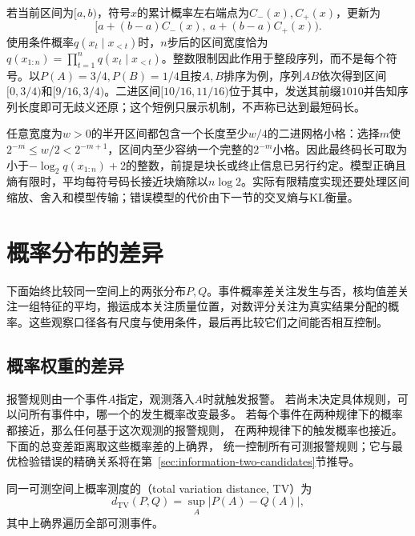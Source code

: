 若当前区间为\([a,b)\)，符号\(x\)的累计概率左右端点为\(C_-(x),C_+(x)\)，更新为
\[
 [a+(b-a)C_-(x),\ a+(b-a)C_+(x)).
\]
使用条件概率\(q(x_t\mid x_{<t})\)时，\(n\)步后的区间宽度恰为
\(q(x_{1:n})=\prod_{t=1}^nq(x_t\mid x_{<t})\)。整数限制因此作用于整段序列，而不是每个符号。以\(P(A)=3/4,P(B)=1/4\)且按\(A,B\)排序为例，序列\(AB\)依次得到区间\([0,3/4)\)和\([9/16,3/4)\)。二进区间\([10/16,11/16)\)位于其中，发送其前缀\(1010\)并告知序列长度即可无歧义还原；这个短例只展示机制，不声称已达到最短码长。

任意宽度为\(w>0\)的半开区间都包含一个长度至少\(w/4\)的二进网格小格：选择\(m\)使\(2^{-m}\leq w/2<2^{-m+1}\)，区间内至少容纳一个完整的\(2^{-m}\)小格。因此最终码长可取为小于\(-\log_2q(x_{1:n})+2\)的整数，前提是块长或终止信息已另行约定。模型正确且熵有限时，平均每符号码长接近块熵除以\(n\log2\)。实际有限精度实现还要处理区间缩放、舍入和模型传输；错误模型的代价由下一节的交叉熵与KL衡量。

\section{概率分布的差异}
\label{sec:information-distribution-relations}
\label{sec:information-comparison-identification}
\label{sec:information-distribution-discrepancies}

下面始终比较同一空间上的两张分布\(P,Q\)。事件概率差关注发生与否，核均值差关注一组特征的平均，搬运成本关注质量位置，对数评分关注为真实结果分配的概率。这些观察口径各有尺度与使用条件，最后再比较它们之间能否相互控制。

\subsection{概率权重的差异}
\label{sec:information-probability-discrepancy}

报警规则由一个事件\(A\)指定，观测落入\(A\)时就触发报警。
若尚未决定具体规则，可以问所有事件中，哪一个的发生概率改变最多。
若每个事件在两种规律下的概率都接近，那么任何基于这次观测的报警规则，
在两种规律下的触发概率也接近。下面的总变差距离取这些概率差的上确界，
统一控制所有可测报警规则；它与最优检验错误的精确关系将在第~\ref{sec:information-two-candidates}节推导。

\begin{definition}[总变差距离]
\label{def:information-total-variation}
同一可测空间上概率测度的（total variation distance, TV）为
\begin{equation}
  d_{\mathrm{TV}}(P,Q)=\sup_A|P(A)-Q(A)|,
  \label{eq:information-total-variation}
\end{equation}
其中上确界遍历全部可测事件。
\end{definition}

